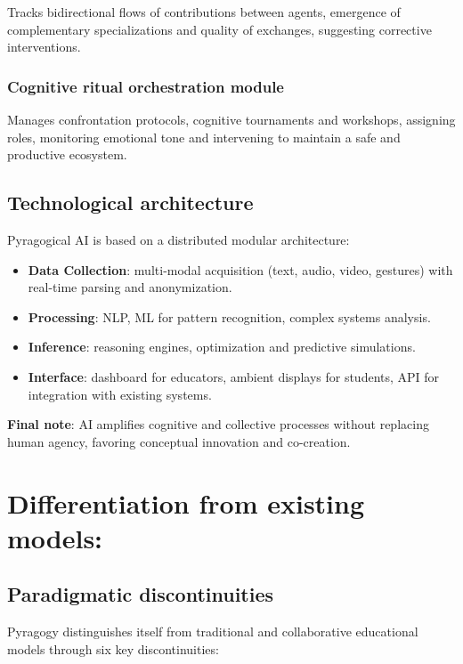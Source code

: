 Tracks bidirectional flows of contributions between agents, emergence of complementary specializations and quality of exchanges, suggesting corrective interventions.

\subsubsection{Cognitive ritual orchestration module}

Manages confrontation protocols, cognitive tournaments and workshops, assigning roles, monitoring emotional tone and intervening to maintain a safe and productive ecosystem.

\subsection{Technological architecture}

Pyragogical AI is based on a distributed modular architecture:

\begin{itemize}
	\item \textbf{Data Collection}: multi-modal acquisition (text, audio, video, gestures) with real-time parsing and anonymization.
	\item \textbf{Processing}: NLP, ML for pattern recognition, complex systems analysis.
	\item \textbf{Inference}: reasoning engines, optimization and predictive simulations.
	\item \textbf{Interface}: dashboard for educators, ambient displays for students, API for integration with existing systems.
\end{itemize}

\textbf{Final note}: AI amplifies cognitive and collective processes without replacing human agency, favoring conceptual innovation and co-creation.

\newpage

\section{Differentiation from existing models:}
\subsection*{Paradigmatic discontinuities}

Pyragogy distinguishes itself from traditional and collaborative educational models through six key discontinuities:


